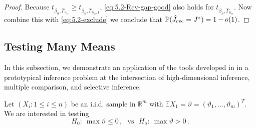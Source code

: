 \documentclass[11pt]{article}
\theoremstyle{plain}
\newcommand{\tr}{{\mathrm{tr}}}
\begin{document}
\begin{proof}
Because $t_{\beta_n,\hat\Gamma_{n_\tr}}\ge t_{\beta_n,\hat\Gamma_{n_\tr,1}}$, \eqref{eq:5.2-Rcv-gap-good} also holds for $t_{\beta_n,\hat\Gamma_{n_\tr}}$. Now combine this with  \eqref{eq:5.2-exclude} we conclude that $\mathbb P(\hat J_{\rm cvc}=J^*)=1-o(1)$.
\end{proof}


\subsection{Testing Many Means}\label{subsec:5.3-argmin}
In this subsection, we demonstrate an application of the tools developed in  in a prototypical inference problem at the intersection of high-dimensional inference, multiple comparison, and selective inference.

Let $(X_i:1\le i\le n)$ be an i.i.d. sample in $\mathbb R^m$ with $\mathbb E X_1=\vartheta=(\vartheta_1,...,\vartheta_m)^T$.
We are interested in testing 
\begin{equation}
    \label{eq:5.3-many-means}
    H_0: ~\max\vartheta\le 0\,,~~~\text{vs}~~~ H_a:~\max \vartheta>0\,.
\end{equation}
\end{document}
